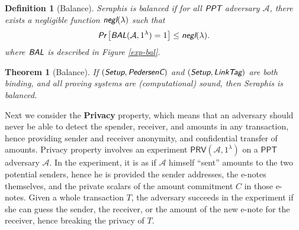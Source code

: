 \documentclass{article}
\newtheorem{definition}{Definition}[section]
\newtheorem{theorem}{Theorem}[section]
\begin{document}
\begin{definition}[Balance]
Seraphis is balanced if for all $\emph{\textsf{PPT}}$ adversary $\mathcal{A}$, there exists a negligible function $\emph{\textsf{negl}}(\lambda)$ such that
\begin{align*}
\emph{\textsf{Pr}}
\left[
\emph{\textsf{BAL}}(\mathcal{A}, 1^{\lambda})=1
\right]
\le \emph{\textsf{negl}}(\lambda).
\end{align*}
where $\emph{\textsf{BAL}}$ is described in Figure \ref{exp-bal}.
\end{definition}
\begin{theorem}[Balance]\label{thm-bal}
If $(\emph{\textsf{Setup}},\emph{\textsf{PedersenC}})$ and $(\emph{\textsf{Setup}},\emph{\textsf{LinkTag}})$ are both binding, and all proving systems are (computational) sound, then Seraphis is balanced.  
\end{theorem}
Next we consider the \textbf{Privacy} property, which means that an adversary should never be able to detect the spender, receiver, and amounts in any transaction, hence providing sender and receiver anonymity, and confidential transfer of amounts. Privacy property involves an experiment $\textsf{PRV}(\mathcal{A}, 1^{\lambda})$ on a $\textsf{PPT}$ adversary $\mathcal{A}$. In the experiment, it is as if $\mathcal{A}$ himself ``sent'' amounts to the two potential senders, hence he is provided the sender addresses, the e-notes themselves, and the private scalars of the amount commitment $C$ in those e-notes. Given a whole transaction $T$, the adversary succeeds in the experiment if she can guess the sender, the receiver, or the amount of the new e-note for the receiver, hence breaking the privacy of $T$.
\end{document}
